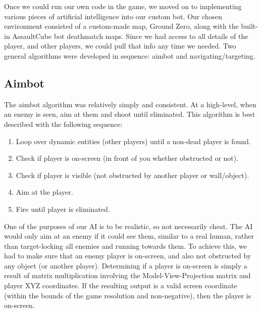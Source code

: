 \documentclass[11pt,a4paper]{article}
\begin{document}
Once we could run our own code in the game, we moved on to implementing various pieces of artificial intelligence into our custom bot. Our chosen environment consisted of a custom-made map, Ground Zero, along with the built-in AssaultCube bot deathmatch maps. Since we had access to all details of the player, and other players, we could pull that info any time we needed. Two general algorithms were developed in sequence: aimbot and navigating/targeting.

\subsection{Aimbot}
The aimbot algorithm was relatively simply and consistent. At a high-level, when an enemy is seen, aim at them and shoot until eliminated. This algorithm is best described with the following sequence: 
	\begin{enumerate}
    \item Loop over dynamic entities (other players) until a non-dead player is found. 

    \item Check if player is on-screen (in front of you whether obstructed or not).

    \item Check if player is visible (not obstructed by another player or wall/object). 

    \item Aim at the player. 

    \item Fire until player is eliminated. 
	\end{enumerate}

One of the purposes of our AI is to be realistic, so not necessarily cheat. The AI would only aim at an enemy if it could see them, similar to a real human, rather than target-locking all enemies and running towards them. To achieve this, we had to make sure that an enemy player is on-screen, and also not obstructed by any object (or another player). Determining if a player is on-screen is simply a result of matrix multiplication involving the Model-View-Projection matrix and player XYZ coordinates. If the resulting output is a valid screen coordinate (within the bounds of the game resolution and non-negative), then the player is on-screen. 
\end{document}

